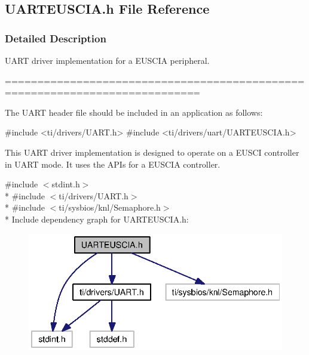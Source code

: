 \subsection{U\+A\+R\+T\+E\+U\+S\+C\+I\+A.\+h File Reference}
\label{_u_a_r_t_e_u_s_c_i_a_8h}


\subsubsection{Detailed Description}
U\+A\+R\+T driver implementation for a E\+U\+S\+C\+I\+A peripheral. 

============================================================================

The U\+A\+R\+T header file should be included in an application as follows\+: 
\begin{DoxyCode}
\textcolor{preprocessor}{#include <ti/drivers/UART.h>}
\textcolor{preprocessor}{#include <ti/drivers/uart/UARTEUSCIA.h>}
\end{DoxyCode}


This U\+A\+R\+T driver implementation is designed to operate on a E\+U\+S\+C\+I controller in U\+A\+R\+T mode. It uses the A\+P\+Is for a E\+U\+S\+C\+I\+A controller. 

{\ttfamily \#include $<$stdint.\+h$>$}\\*
{\ttfamily \#include $<$ti/drivers/\+U\+A\+R\+T.\+h$>$}\\*
{\ttfamily \#include $<$ti/sysbios/knl/\+Semaphore.\+h$>$}\\*
Include dependency graph for U\+A\+R\+T\+E\+U\+S\+C\+I\+A.\+h\+:
\nopagebreak
\begin{figure}[H]
\begin{center}
\leavevmode
\includegraphics[width=330pt]{_u_a_r_t_e_u_s_c_i_a_8h__incl}
\end{center}
\end{figure}
